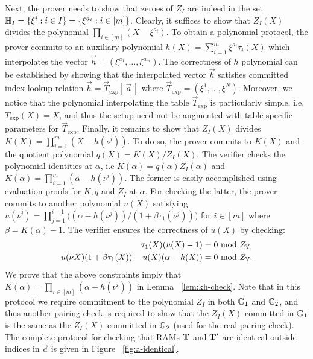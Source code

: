 Next, the prover needs to show that zeroes of $Z_I$ are indeed in the set $\mathbb{H}_I=\{\xi^i: i\in I\}=\{\xi^{a_i}:i\in [m]\}$.
Clearly, it suffices to show that $Z_I(X)$ divides the polynomial $\prod_{i\in [m]}(X - \xi^{a_i})$. To obtain a
polynomial protocol, the prover commits to an auxiliary polynomial $h(X)=\sum_{i=1}^m \xi^{a_i}\tau_i(X)$
which interpolates the vector $\vec{h}=(\xi^{a_1},\ldots,\xi^{a_m})$. The correctness of $h$ polynomial can be
established by showing that the interpolated vector $\vec{h}$ satisfies committed index lookup relation
$\vec{h}=\vec{T}_{\exp}[\,\vec{a}\,]$ where $\vec{T}_{\exp}=(\xi^1,\ldots,\xi^N)$. Moreover, we notice that the polynomial
interpolating the table $\vec{T}_{\exp}$ is particularly simple, i.e, $T_{\exp}(X)=X$, and thus the setup need not be
augmented with table-specific parameters for $\vec{T}_{\exp}$.
Finally, it remains to show that $Z_I(X)$ divides $K(X) = \prod_{i=1}^m (X - h(\nu^i))$. To do so, the prover commits to
$K(X)$ and the quotient polynomial $q(X)=K(X)/Z_I(X)$. The verifier checks the polynomial identities
at $\alpha$, i.e $K(\alpha)=q(\alpha)Z_I(\alpha)$ and $K(\alpha)=\prod_{i=1}^m(\alpha - h(\nu^i))$.
The former is easily accomplished
using evaluation proofs for $K,q$ and $Z_I$ at $\alpha$.
For checking the latter, the prover commits to another polynomial
$u(X)$ satisfying $u(\nu^i)=\prod_{j=1}^{i-1}\big((\alpha - h(\nu^j))/(1 + \beta\tau_1(\nu^j))\big)$ for $i\in [m]$
where $\beta=K(\alpha) - 1$.
The verifier ensures the correctness of $u(X)$ by checking:
\begin{equation}
    \begin{aligned}
        \tau_1(X)(u(X) - 1) &= 0 \text{ mod } Z_{\mathbb{V}} \\
        u(\nu X)(1+\beta \tau_1(X))-u(X)(\alpha - h(X)) &= 0 \text{ mod } Z_{\mathbb{V}}.
    \end{aligned}
    \label{eq:kh-check}
\end{equation}
We prove that the above constraints imply that $K(\alpha)=\prod_{i\in [m]}(\alpha - h(\nu^i))$ in Lemma ~\ref{lem:kh-check}.
Note that in this protocol we require commitment to the polynomial $Z_I$ in both $\mathbb{G}_1$ and $\mathbb{G}_2$,
and thus another pairing check is required to show that the $Z_I(X)$ committed in $\mathbb{G}_1$
is the same as the $Z_I(X)$ committed in $\mathbb{G}_2$ (used for the real pairing check).
The complete protocol for checking that RAMs $\mathbf{T}$ and $\mathbf{T}'$ are identical outside indices in $\vec{a}$
is given in Figure ~\ref{fig:a-identical}.


